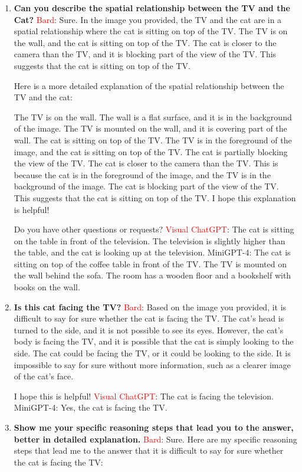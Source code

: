 \begin{enumerate}
    \item \textbf{Can you describe the spatial relationship between the TV and the Cat?}
    \subitem \textcolor{Red}{Bard}: 
    Sure. In the image you provided, the TV and the cat are in a spatial relationship where the cat is sitting on top of the TV. The TV is on the wall, and the cat is sitting on top of the TV. The cat is closer to the camera than the TV, and it is blocking part of the view of the TV. This suggests that the cat is sitting on top of the TV.

    Here is a more detailed explanation of the spatial relationship between the TV and the cat:

    The TV is on the wall. The wall is a flat surface, and it is in the background of the image. The TV is mounted on the wall, and it is covering part of the wall.
    The cat is sitting on top of the TV. The TV is in the foreground of the image, and the cat is sitting on top of the TV. The cat is partially blocking the view of the TV.
    The cat is closer to the camera than the TV. This is because the cat is in the foreground of the image, and the TV is in the background of the image.
    The cat is blocking part of the view of the TV. This suggests that the cat is sitting on top of the TV.
    I hope this explanation is helpful!

    Do you have other questions or requests?
    \subitem \textcolor{red}{Visual ChatGPT}: The cat is sitting on the table in front of the television. The television is slightly higher than the table, and the cat is looking up at the television.
    \subitem MiniGPT-4: The cat is sitting on top of the coffee table in front of the TV. The TV is mounted on the wall behind the sofa. The room has a wooden floor and a bookshelf with books on the wall.
    \item \textbf{Is this cat facing the TV?}
    \subitem \textcolor{Red}{Bard}: Based on the image you provided, it is difficult to say for sure whether the cat is facing the TV. The cat's head is turned to the side, and it is not possible to see its eyes. However, the cat's body is facing the TV, and it is possible that the cat is simply looking to the side. The cat could be facing the TV, or it could be looking to the side. It is impossible to say for sure without more information, such as a clearer image of the cat's face.

    I hope this is helpful!
    \subitem \textcolor{red}{Visual ChatGPT}: The cat is facing the television.
    \subitem MiniGPT-4: Yes, the cat is facing the TV.
    \item \textbf{Show me your specific reasoning steps that lead you to the answer, better in detailed explanation.}
    \subitem \textcolor{Red}{Bard}: Sure. Here are my specific reasoning steps that lead me to the answer that it is difficult to say for sure whether the cat is facing the TV:


\end{enumerate}
